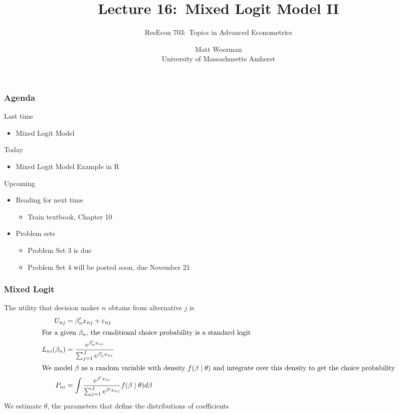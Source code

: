 \documentclass{beamer}
\title[Lecture 16:\ Mixed Logit Model II]{Lecture 16:\ Mixed Logit Model II}
\author[ResEcon 703:\ Advanced Econometrics]{ResEcon 703:\ Topics in Advanced Econometrics}
\date{Matt Woerman\\University of Massachusetts Amherst}
\begin{document}
{ 
\begin{frame}[noframenumbering]
    \titlepage
\end{frame}
}

\begin{frame}\frametitle{Agenda}
    Last time
    \begin{itemize}
        \item Mixed Logit Model
    \end{itemize}
    \vspace{2ex}
    Today
    \begin{itemize}
        \item Mixed Logit Model Example in R
    \end{itemize}
    \vspace{2ex}
    Upcoming
    \begin{itemize}
        \item Reading for next time
        \begin{itemize}
            \item Train textbook, Chapter 10
        \end{itemize}
        \item Problem sets
        \begin{itemize}
            \item Problem Set 3 is due
            \item Problem Set 4 will be posted soon, due November 21
        \end{itemize}
    \end{itemize}
\end{frame}

\begin{frame}\frametitle{Mixed Logit}
	The utility that decision maker $n$ obtains from alternative $j$ is
	\begin{align*}
		U_{nj} &= \beta_n' x_{nj} + \varepsilon_{nj} \\
	    \intertext{For a given $\beta_n$, the conditional choice probability is a standard logit}
	    L_{ni}(\beta_n) &= \frac{e^{\beta_n' x_{ni}}}{\sum_{j = 1}^J e^{\beta_n' x_{nj}}} \\
	    \intertext{We model $\beta$ as a random variable with density $f(\beta \mid \theta)$ and integrate over this density to get the choice probability}
	    P_{ni} &= \int \frac{e^{\beta' x_{ni}}}{\sum_{j = 1}^J e^{\beta' x_{nj}}} f(\beta \mid \theta) d \beta
	\end{align*}
	We estimate $\theta$, the parameters that define the distributions of coefficients
\end{frame}
\end{document}
